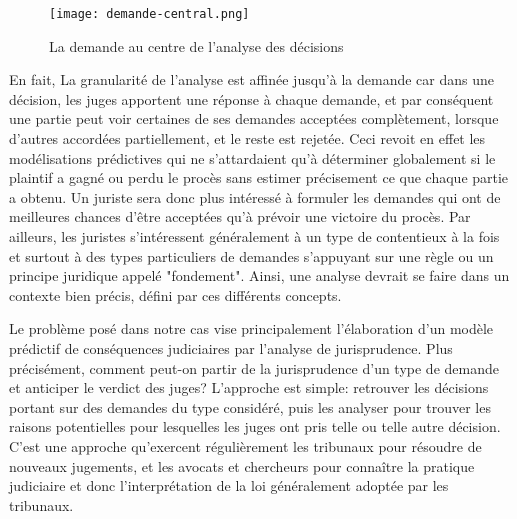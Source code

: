 \begin{figure}[h]
    \centering
    \texttt{[image: demande-central.png]}
    \caption{La demande au centre de l'analyse des décisions}
    \label{fig:intro:demande-central}
\end{figure}

En fait, La granularité de l'analyse est affinée jusqu'à la demande car dans une décision, les juges apportent une réponse à chaque demande, et par conséquent une partie peut voir certaines de ses demandes acceptées complètement, lorsque d'autres accordées partiellement, et le reste est rejetée.  Ceci revoit en effet les modélisations prédictives qui ne s'attardaient qu'à déterminer globalement si le plaintif a  gagné ou perdu le procès sans estimer précisement ce que chaque partie a obtenu. Un juriste sera donc plus intéressé à formuler les demandes qui ont de meilleures chances d'être acceptées qu'à prévoir une victoire du procès. Par ailleurs, les juristes s'intéressent généralement à un type de contentieux à la fois et surtout à des types particuliers de demandes s'appuyant sur une règle ou un principe juridique appelé "fondement". Ainsi, une analyse devrait se faire dans un contexte bien précis, défini par ces différents concepts.


Le problème posé dans notre cas vise principalement l'élaboration d'un modèle prédictif de conséquences judiciaires par l'analyse de jurisprudence. Plus précisément, comment peut-on partir de la jurisprudence d'un type de demande et anticiper le verdict des juges? L'approche est simple: retrouver les décisions portant sur des demandes du type considéré, puis les analyser pour trouver les raisons potentielles pour lesquelles les juges ont pris telle ou telle autre décision. C'est une approche qu'exercent régulièrement les tribunaux pour résoudre de nouveaux jugements, et les avocats et chercheurs pour connaître la pratique judiciaire et donc l'interprétation de la loi généralement adoptée par les tribunaux.


